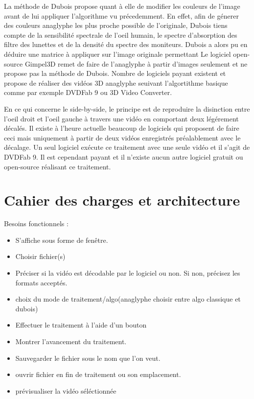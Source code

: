 \documentclass[10pt,a4paper]{article}
\begin{document}
La méthode de Dubois propose quant à elle de modifier les couleurs de l'image avant de lui appliquer l'algorithme vu précedemment.
En effet, afin de génerer des couleurs anaglyphe les plus proche possible de l'originale, Dubois tiens compte de la sensibilité spectrale de l'oeil humain,
le spectre d'absorption des filtre des lunettes et de la densité du spectre des moniteurs.
Dubois a alors pu en déduire une matrice à appliquer sur l'image originale permettant
Le logiciel open-source Gimpel3D remet de faire de l'anaglyphe à partir d'images seulement et ne propose pas la méthode de Dubois. Nombre de logiciels payant existent et propose de réaliser des vidéos 3D
anaglyphe seuivant l'algortithme basique comme par exemple DVDFab 9 ou  3D Video Converter.

En ce qui concerne le side-by-side, le principe est de reproduire la disinction entre l'oeil droit et l'oeil gauche à travers une vidéo en comportant deux légérement décalés.
Il existe à l'heure actuelle beaucoup de logiciels qui proposent de faire ceci mais uniquement à partir de deux vidéos enregistrés préalablement avec le décalage.
Un seul logiciel exécute ce traitement avec une seule vidéo et il s'agit de DVDFab 9. Il est cependant payant et il n'existe aucun autre logiciel gratuit ou open-source réalisant ce traitement.

\section{Cahier des charges et architecture}

Besoins fonctionnels :\newline
\begin{itemize}
\item S'affiche sous forme de fenêtre.
\item Choisir fichier(s)
\item Préciser si la vidéo est décodable par le logiciel ou non. Si non, précisez les formats acceptés.
\item choix du mode de traitement/algo(anaglyphe choisir entre algo classique et dubois)
\item Effectuer le traitement à l'aide d'un bouton
\item Montrer l'avancement du traitement.
\item Sauvegarder le fichier sous le nom que l'on veut.
\item ouvrir fichier en fin de traitement ou son emplacement.
\item prévisualiser la vidéo séléctionnée\newline
\end{itemize}
\end{document}
